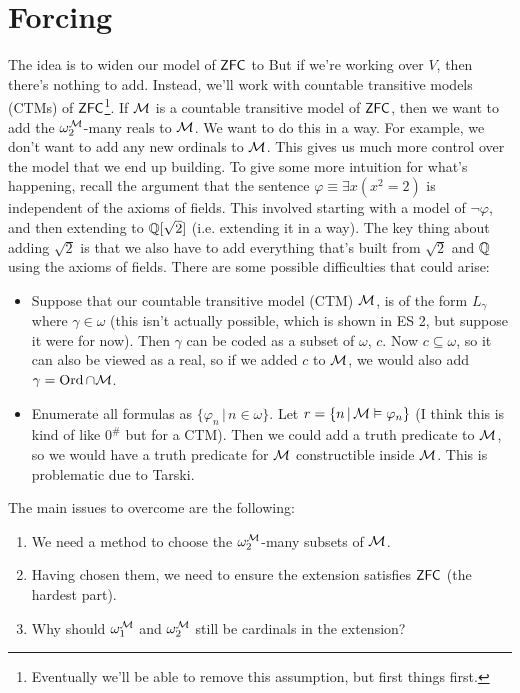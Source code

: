 \documentclass{article}
\begin{document}
\section{Forcing}
The idea is to widen our model of $\mathsf{ZFC}$ to  But if we're working over $V$, then there's nothing to add. Instead, we'll work with countable transitive models (CTMs) of $\mathsf{ZFC}$\footnote{Eventually we'll be able to remove this assumption, but first things first.}. If $\mathcal{M}$ is a countable transitive model of $\mathsf{ZFC}$, then we want to add the $\omega_{2}^{\mathcal{M}}$-many reals to $\mathcal{M}$. We want to do this in a  way. For example, we don't want to add any new ordinals to $\mathcal{M}$. This gives us much more control over the model that we end up building. \gap To give some more intuition for what's happening, recall the argument that the sentence $\varphi \equiv \exists x (x^{2}=2)$ is independent of the axioms of fields. This involved starting with a model of $\neg \varphi$, and then extending to $\mathbb{Q}[\sqrt{2}]$ (i.e. extending it in a  way). The key thing about adding $\sqrt{2}$ is that we also have to add everything that's built from $\sqrt{2}$ and $\mathbb{Q}$ using the axioms of fields.\gap
There are some possible difficulties that could arise: \begin{itemize}
    \item Suppose that our countable transitive model (CTM) $\mathcal{M}$, is of the form $L_{\gamma}$ where $\gamma \in \omega$ (this isn't actually possible, which is shown in ES 2, but suppose it were for now). Then $\gamma$ can be coded as a subset of $\omega$, $c$. Now $c \subseteq \omega$, so it can also be viewed as a real, so if we added $c$ to $\mathcal{M}$, we would also add $\gamma = \operatorname{Ord} \cap \mathcal{M}$.
    \item Enumerate all formulas as $\{\varphi_{n} \, | \, n \in \omega\}$. Let $r = \{n \, | \, \mathcal{M} \vDash \varphi_{n}\}$ (I think this is kind of like $0^{\#}$ but for a CTM). Then we could add a truth predicate to $\mathcal{M}$, so we would have a truth predicate for $\mathcal{M}$ constructible inside $\mathcal{M}$. This is problematic due to Tarski.
\end{itemize}
The main issues to overcome are the following: \begin{enumerate}
    \item We need a method to choose the $\omega_{2}^{\mathcal{M}}$-many subsets of $\mathcal{M}$.
    \item Having chosen them, we need to ensure the extension satisfies $\mathsf{ZFC}$ (the hardest part).
    \item Why should $\omega_{1}^{\mathcal{M}}$ and $\omega_{2}^{\mathcal{M}}$ still be cardinals in the extension?
\end{enumerate}
\end{document}
